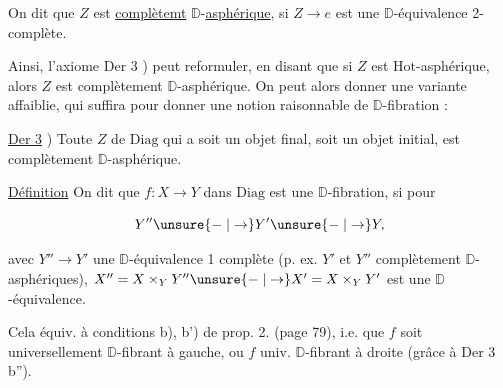 
On dit que $Z$ est \uline{complètemt} $\mathbb D$-\uline{asphérique}, si $Z\longrightarrow e$ est une $\mathbb D$-équivalence 2-complète.

Ainsi, l'axiome Der 3 ) peut  reformuler, en disant que si $Z$ est $\mathrm{Hot}$-asphérique, alors $Z$ est complètement $\mathbb D$-asphérique. On peut alors donner une variante affaiblie, qui suffira pour donner une notion raisonnable de $\mathbb D$-fibration :


\uline{Der 3} ) Toute $Z$ de $\mathrm{Diag}$ qui a soit un objet final, soit un objet initial, est complètement $\mathbb D$-asphérique.

\uline{Définition} On dit que $f:X\to Y$ dans $\mathrm{Diag}$ est une $\mathbb D$-fibration, si pour

\[
Y''\unsure{\relbar|\to}Y'\unsure{\relbar|\to}Y,
\]

avec $Y''\to Y'$  une $\mathbb D$-équivalence 1 complète (p. ex. $Y'$ et $Y''$ complètement $\mathbb D$-asphériques), $X''=X\times_Y Y''\unsure{\relbar|\to}X'=X\times_Y Y'$ est une $\mathbb D$-équivalence.

Cela équiv. à  conditions b), b') de prop. 2. (page 79), i.e. que $f$ soit universellement $\mathbb D$-fibrant à gauche, ou $f$ univ. $\mathbb D$-fibrant à droite (grâce à Der 3 b'').

